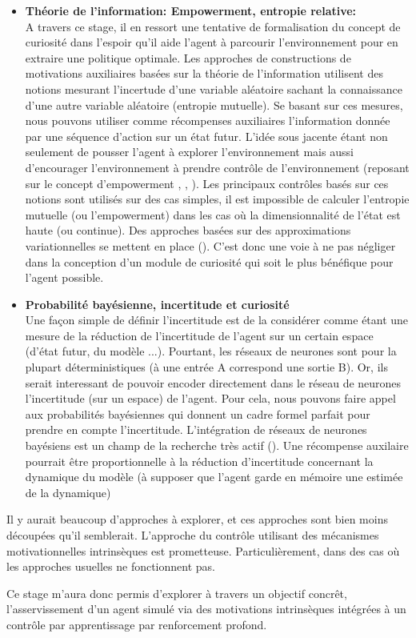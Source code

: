 \begin{itemize}
\item \textbf{Théorie de l'information: Empowerment, entropie relative:}\\
    A travers ce stage, il en ressort une tentative de formalisation du concept de curiosité dans l'espoir qu'il aide l'agent à parcourir l'environnement pour en extraire une politique optimale. Les approches de constructions de motivations auxiliaires basées sur la théorie de l'information utilisent des notions mesurant l'incertude d'une variable aléatoire sachant la connaissance d'une autre variable aléatoire (entropie mutuelle). Se basant sur ces mesures, nous pouvons utiliser comme récompenses auxiliaires l'information donnée par une séquence d'action sur un état futur. L'idée sous jacente étant non seulement de pousser l'agent à explorer l'environnement mais aussi d'encourager l'environnement à prendre contrôle de l'environnement (reposant sur le concept d'empowerment \cite{empowerment}, \cite{empowerment2}, \cite{empowerment3}). Les principaux contrôles basés sur ces notions sont utilisés sur des cas simples, il est impossible de calculer l'entropie mutuelle (ou l'empowerment) dans les cas où la dimensionnalité de l'état est haute (ou continue). Des approches basées sur des approximations variationnelles se mettent en place (\cite{controleempowerment}). C'est donc une voie à ne pas négliger dans la conception d'un module de curiosité qui soit le plus bénéfique pour l'agent possible. 
\item \textbf{Probabilité bayésienne, incertitude et curiosité}\\
    Une façon simple de définir l'incertitude est de la considérer comme étant une mesure de la réduction de l'incertitude de l'agent sur un certain espace (d'état futur, du modèle ...). Pourtant, les réseaux de neurones sont pour la plupart déterministiques (à une entrée A correspond une sortie B). Or, ils serait interessant de pouvoir encoder directement dans le réseau de neurones l'incertitude (sur un espace) de l'agent. Pour cela, nous pouvons faire appel aux probabilités bayésiennes qui donnent un cadre formel parfait pour prendre en compte l'incertitude. L'intégration de réseaux de neurones bayésiens est un champ de la recherche très actif (\cite{neuronebayes}). Une récompense auxilaire pourrait être proportionnelle à la réduction d'incertitude concernant la dynamique du modèle (à supposer que l'agent garde en mémoire une estimée de la dynamique) \cite{VIME}
\end{itemize}

Il y aurait beaucoup d'approches à explorer, et ces approches sont bien moins découpées qu'il semblerait. L'approche du contrôle utilisant des mécanismes motivationnelles intrinsèques est prometteuse. Particulièrement, dans des cas où les approches usuelles ne fonctionnent pas. 

Ce stage m'aura donc permis d'explorer à travers un objectif concrêt, l'asservissement d'un agent simulé via des motivations intrinsèques intégrées à un contrôle par apprentissage par renforcement profond.

